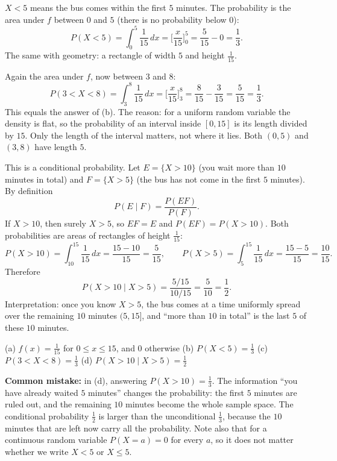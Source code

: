 \begin{solution}
	 $X<5$ means the bus comes within the first $5$ minutes. The
	probability is the area under $f$ between $0$ and $5$ (there is no
	probability below $0$):
	\[
		P(X<5)=\int_{0}^{5}\frac1{15}\,dx=\Big[\frac{x}{15}\Big]_{0}^{5}
		=\frac5{15}-0=\frac13 .
	\]
	The same with geometry: a rectangle of width $5$ and height $\frac1{15}$.

	 Again the area under $f$, now between $3$ and $8$:
	\[
		P(3<X<8)=\int_{3}^{8}\frac1{15}\,dx=\Big[\frac{x}{15}\Big]_{3}^{8}
		=\frac8{15}-\frac3{15}=\frac5{15}=\frac13 .
	\]
	This equals the answer of (b). The reason: for a uniform random variable
	the density is flat, so the probability of an interval inside $[0,15]$ is
	its length divided by $15$. Only the length of the interval matters, not
	where it lies. Both $(0,5)$ and $(3,8)$ have length $5$.

	 This is a conditional probability. Let $E=\{X>10\}$ (you wait
	more than $10$ minutes in total) and $F=\{X>5\}$ (the bus has not come in
	the first $5$ minutes). By definition
	\[
		P(E\mid F)=\frac{P(EF)}{P(F)} .
	\]
	If $X>10$, then surely $X>5$, so $EF=E$ and $P(EF)=P(X>10)$. Both
	probabilities are areas of rectangles of height $\frac1{15}$:
	\[
		P(X>10)=\int_{10}^{15}\frac1{15}\,dx=\frac{15-10}{15}=\frac5{15},
		\qquad
		P(X>5)=\int_{5}^{15}\frac1{15}\,dx=\frac{15-5}{15}=\frac{10}{15}.
	\]
	Therefore
	\[
		P(X>10\mid X>5)=\frac{5/15}{10/15}=\frac5{10}=\frac12 .
	\]
	Interpretation: once you know $X>5$, the bus comes at a time uniformly
	spread over the remaining $10$ minutes $(5,15]$, and ``more than $10$ in
	total'' is the last $5$ of these $10$ minutes.

	\begin{answer}
		(a) ${f(x)=\frac1{15}}$ for ${0\le x\le15}$, and $0$ otherwise \quad
		(b) ${P(X<5)=\frac13}$ \quad
		(c) ${P(3<X<8)=\frac13}$ \quad
		(d) ${P(X>10\mid X>5)=\frac12}$
	\end{answer}
	\begin{remark}
		\textbf{Common mistake:} in (d), answering $P(X>10)=\frac13$. The
		information ``you have already waited $5$ minutes'' changes the
		probability: the first $5$ minutes are ruled out, and the remaining
		$10$ minutes become the whole sample space. The conditional probability
		$\frac12$ is larger than the unconditional $\frac13$, because the $10$
		minutes that are left now carry all the probability.
		Note also that for a continuous random variable $P(X=a)=0$ for every
		$a$, so it does not matter whether we write $X<5$ or $X\le5$.
	\end{remark}
\end{solution}
